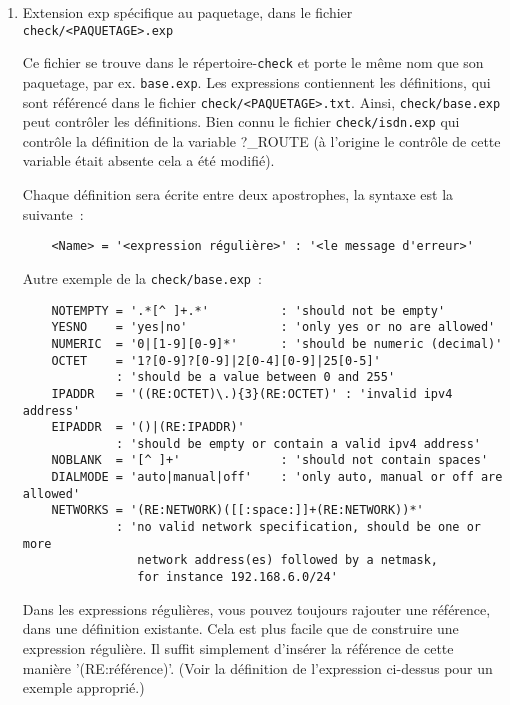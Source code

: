   \begin{enumerate}
  \item Extension exp spécifique au paquetage, dans le fichier \texttt{check/<PAQUETAGE>.exp}

    Ce fichier se trouve dans le répertoire-\texttt{check} et porte le même nom que son
    paquetage, par ex. \texttt{base.exp}. Les expressions contiennent les définitions, qui
    sont référencé dans le fichier \texttt{check/<PAQUETAGE>.txt}. Ainsi, \texttt{check/base.exp}
	peut contrôler les définitions. Bien connu le fichier \texttt{check/isdn.exp} qui contrôle
	la définition de la variable ?\_ROUTE (à l'origine le contrôle de cette
    variable était absente cela a été modifié).

Chaque définition sera écrite entre deux apostrophes, la syntaxe est la suivante~:
\begin{example}
\begin{verbatim}
    <Name> = '<expression régulière>' : '<le message d'erreur>'
\end{verbatim}
\end{example}
Autre exemple de la \texttt{check/base.exp}~:
\begin{example}
\begin{verbatim}
    NOTEMPTY = '.*[^ ]+.*'          : 'should not be empty'
    YESNO    = 'yes|no'             : 'only yes or no are allowed'
    NUMERIC  = '0|[1-9][0-9]*'      : 'should be numeric (decimal)'
    OCTET    = '1?[0-9]?[0-9]|2[0-4][0-9]|25[0-5]'
             : 'should be a value between 0 and 255'
    IPADDR   = '((RE:OCTET)\.){3}(RE:OCTET)' : 'invalid ipv4 address'
    EIPADDR  = '()|(RE:IPADDR)'
             : 'should be empty or contain a valid ipv4 address'
    NOBLANK  = '[^ ]+'              : 'should not contain spaces'
    DIALMODE = 'auto|manual|off'    : 'only auto, manual or off are allowed'
    NETWORKS = '(RE:NETWORK)([[:space:]]+(RE:NETWORK))*'
             : 'no valid network specification, should be one or more
                network address(es) followed by a netmask,
                for instance 192.168.6.0/24'
\end{verbatim}
\end{example}

Dans les expressions régulières, vous pouvez toujours rajouter une référence,
dans une définition existante. Cela est plus facile que de construire une
expression régulière. Il suffit simplement d’insérer la référence de cette manière
'(RE:référence)'. (Voir la définition de l'expression  ci-dessus
pour un exemple approprié.)


\end{enumerate}
